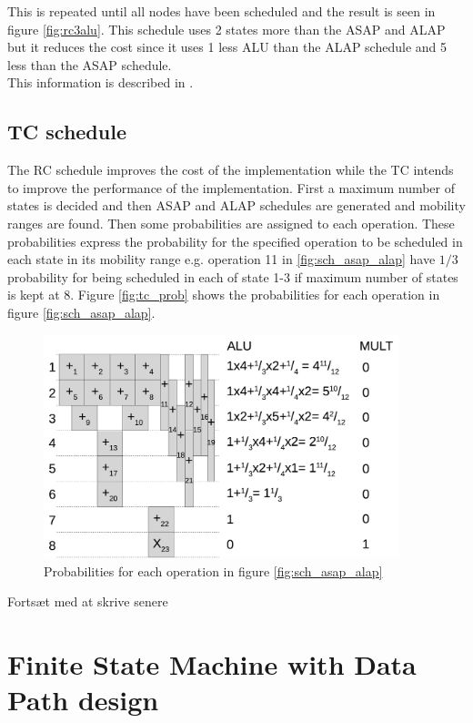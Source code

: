 This is repeated until all nodes have been scheduled and the result is seen in figure \vref{fig:rc3alu}. This schedule uses 2 states more than the ASAP and ALAP but it reduces the cost since it uses 1 less ALU than the ALAP schedule and 5 less than the ASAP schedule.  \\
This information is described in \cite{gajski2009}.

\subsection{TC schedule}
The RC schedule improves the cost of the implementation while the TC intends to improve the performance of the implementation. First a maximum number of states is decided and then ASAP and ALAP schedules are generated and mobility ranges are found. Then some probabilities are assigned to each operation. These probabilities express the probability for the specified operation to be scheduled in each state in its mobility range e.g. operation 11 in \vref{fig:sch_asap_alap} have $1/3$ probability for being scheduled in each of state 1-3 if maximum number of states is kept at 8. Figure \vref{fig:tc_prob} shows the probabilities for each operation in figure \vref{fig:sch_asap_alap}.
\begin{figure}[ht!]
  \centering
  \includegraphics[height=6.5cm]{figures/tcscheprob}
  \caption{Probabilities for each operation in figure \vref{fig:sch_asap_alap}}
  \label{fig:tc_prob}
\end{figure}
{\color{gray}Fortsæt med at skrive senere}


\section{Finite State Machine with Data Path design}

